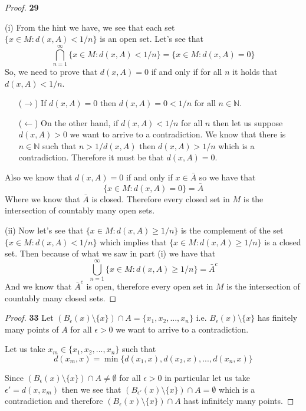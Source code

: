 \documentclass[11pt]{article}
\newcommand{\N}{\mathbb{N}}
\theoremstyle{definition}
\begin{document}
    \begin{proof}{\textbf{29}}
        \item[(i)]
        From the hint we have, we see that each set\\
        $\{x \in M : d(x,A) < 1/n\}$ is an open set. Let's see that
        $$\bigcap_{n=1}^{\infty}\{x \in M : d(x,A) < 1/n\} = \{x \in M : d(x,A) = 0\}$$
        So, we need to prove that $d(x,A) = 0$ if
        and only if for all $n$ it holds that $d(x,A) < 1/n$.
        \begin{itemize}
        \item [($\rightarrow$)] If $d(x,A) = 0$ then $d(x, A) = 0 < 1/n$ for all
        $n \in \N$.
        \item [($\leftarrow$)] On the other hand, if $d(x,A) < 1/n$ for all $n$
        then let us suppose $d(x,A) > 0$ we want to arrive to a contradiction.
        We know that there is $n \in \N$ such that $n > 1/d(x,A)$ then
        $d(x,A) > 1/n$ which is a contradiction. Therefore it must be that
        $d(x,A) = 0$.
        \end{itemize}
        Also we know that $d(x,A) = 0$ if and only if $x \in \bar{A}$ so we have
        that
        $$\{x \in M : d(x,A) = 0\} = \bar{A}$$
        Where we know that $\bar{A}$ is closed.
        Therefore every closed set in $M$ is the intersection of countably many
        open sets.

        \item[(ii)] Now let's see that $\{x \in M : d(x,A) \geq 1/n\}$ is the
        complement of the set $\{x \in M : d(x,A) < 1/n\}$ which implies that
        $\{x \in M : d(x,A) \geq 1/n\}$ is a closed set. Then because of 
        what we saw in part (i) we have that
        $$\bigcup_{n=1}^{\infty}\{x \in M : d(x,A) \geq 1/n\} = \bar{A}^c$$
        And we know that $\bar{A}^c$ is open, therefore every open set in $M$ is
        the intersection of countably many closed sets.
    \end{proof}
    \begin{proof}{\textbf{33}}
        Let $(B_\epsilon(x) \setminus \{x\}) \cap A = \{x_1, x_2, ..., x_n\}$
        i.e. $B_\epsilon(x) \setminus \{x\}$ has finitely many points of $A$
        for all $\epsilon > 0$ we want to arrive to a contradiction.
        
        Let us take $x_m \in \{x_1, x_2, ..., x_n\}$ such that
        $$d(x_m, x) = \min\{d(x_1, x), d(x_2, x), ..., d(x_n, x)\}$$

        Since $(B_\epsilon(x) \setminus \{x\}) \cap A \neq \emptyset$ 
        for all $\epsilon > 0$ in particular let us take $\epsilon' = d(x,x_m)$
        then we see that $(B_{\epsilon'}(x) \setminus \{x\}) \cap A = \emptyset$
        which is a contradiction and therefore
        $(B_\epsilon(x) \setminus \{x\}) \cap A$ hast infinitely many points.
    \end{proof}
\end{document}
